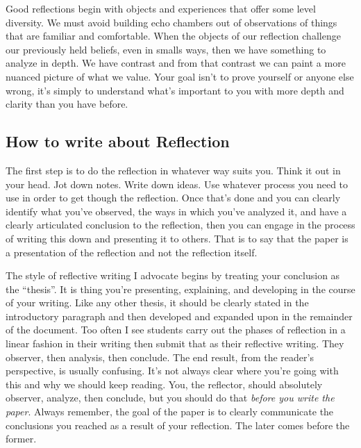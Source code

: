 \documentclass[nobib]{tufte-handout}
\begin{document}
Good reflections begin with objects and experiences that offer some level diversity. We must avoid building echo chambers out of observations of things that are familiar and comfortable.  When the objects of our reflection challenge our previously held beliefs, even in smalls ways, then we have something to analyze in depth. We have contrast and from that contrast we can paint a more nuanced picture of what we value. Your goal isn't to prove yourself or anyone else wrong, it's simply to understand what's important to you with more depth and clarity than you have before.


\subsection*{How to write about Reflection}

The first step is to do the reflection in whatever way suits you. Think it out in your head. Jot down notes. Write down ideas. Use whatever process you need to use in order to get though the reflection. Once that's done and you can clearly identify what you've observed, the ways in which you've analyzed it, and have a clearly articulated conclusion to the reflection, then you can engage in the process of writing this down and presenting it to others. That is to say that the paper is a presentation of the reflection and not the reflection itself.

The style of reflective writing I advocate begins by treating your conclusion as the ``thesis''. It is thing you're presenting, explaining, and developing in the course of your writing. Like any other thesis, it should be clearly stated in the introductory paragraph and then developed and expanded upon in the remainder of the document. Too often I see students carry out the phases of reflection in a linear fashion in their writing then submit that as their reflective writing.  They observer, then analysis, then conclude.  The end result, from the reader's perspective, is usually confusing. It's not always clear where you're going with this and why we should keep reading. You, the reflector, should absolutely observer, analyze, then conclude, but you should do that \textit{before you write the paper}.  Always remember, the goal of the paper is to clearly communicate the conclusions you reached as a result of your reflection. The later comes before the former.
\end{document}
